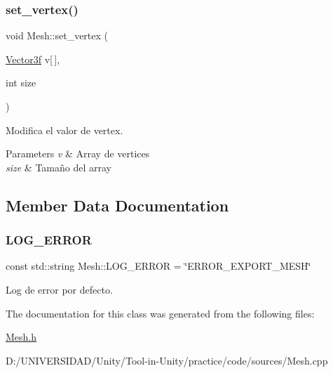 \subsubsection{\texorpdfstring{set\_vertex()}{set\_vertex()}}
{\footnotesize\ttfamily void Mesh\+::set\+\_\+vertex (\begin{DoxyParamCaption}\item[{\mbox{\hyperlink{structmathexp_1_1_vector3f}{Vector3f}}}]{v\mbox{[}$\,$\mbox{]},  }\item[{int}]{size }\end{DoxyParamCaption})}



Modifica el valor de vertex. 


\begin{DoxyParams}{Parameters}
{\em v} & Array de vertices \\
\hline
{\em size} & Tamaño del array \\
\hline
\end{DoxyParams}


\subsection{Member Data Documentation}
\mbox{\label{class_mesh_a53395da1def300c2455ef4b8c7c326dc}} 
\subsubsection{\texorpdfstring{LOG\_ERROR}{LOG\_ERROR}}
{\footnotesize\ttfamily const std\+::string Mesh\+::\+L\+O\+G\+\_\+\+E\+R\+R\+OR = \char`\"{}E\+R\+R\+O\+R\+\_\+\+E\+X\+P\+O\+R\+T\+\_\+\+M\+E\+SH\char`\"{}}



Log de error por defecto. 



The documentation for this class was generated from the following files\+:\begin{DoxyCompactItemize}
\item 
\mbox{\hyperlink{_mesh_8h}{Mesh.\+h}}\item 
D\+:/\+U\+N\+I\+V\+E\+R\+S\+I\+D\+A\+D/\+Unity/\+Tool-\/in-\/\+Unity/practice/code/sources/Mesh.\+cpp\end{DoxyCompactItemize}
